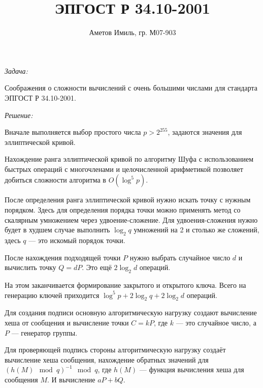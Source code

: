 \documentclass[10pt]{article}
\author{Аметов Имиль, гр. М07-903}
\title{ЭПГОСТ Р 34.10-2001}
\begin{document}
\maketitle

\emph{Задача:}

Соображения о сложности вычислений с очень большими числами для стандарта ЭПГОСТ Р 34.10-2001.

\emph{Решение:}

Вначале выполняется выбор простого числа $p > 2^{255}$, задаются значения для эллиптической кривой.

Нахождение ранга эллиптической кривой по алгоритму Шуфа с использованием быстрых операций с многочленами и целочисленной арифметикой позволяет добиться сложности алгоритма в $O(\log^5 p)$.

После определения ранга эллиптической кривой нужно искать точку с нужным порядком. Здесь для определения порядка точки можно применять метод со скалярным умножением через удвоение-сложение. Для удвоения-сложения нужно будет в худшем случае выполнить $\log_2 q$ умножений на 2 и столько же сложений, здесь $q$ --- это искомый порядок точки.

После нахождения подходящей точки $P$ нужно выбрать случайное число $d$ и вычислить точку $Q = dP$. Это ещё $2 \log_2 d$ операций.

На этом заканчивается формирование закрытого и открытого ключа. Всего на генерацию ключей приходится $\log^5 p + 2 \log_2 q + 2 \log_2 d$ операций.

Для создания подписи основную алгоритмическую нагрузку создают вычисление хеша от сообщения и вычисление точки $C = k P$, где $k$ --- это случайное число, а $P$ --- генератор группы.

Для проверяющей подпись стороны алгоритмическую нагрузку создаёт вычисление хеша сообщения, нахождение обратных значений для $(h(M) \mod q)^{-1} \mod q$, где $h(M)$ --- функция вычисления хеша для сообщения $M$. И вычисление $aP+bQ$.
\end{document}
